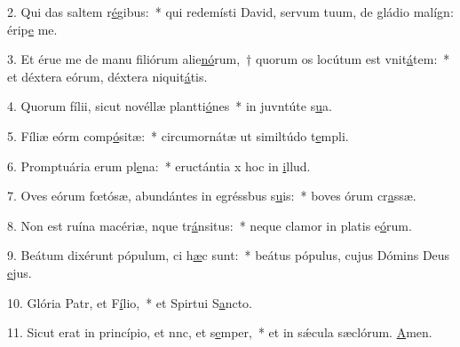 2. Qui das saltem r\uline{é}gibus:~* qui redemísti David, servum tuum, de gládio malígn: érip\uline{e} me.\par 
3. Et érue me de manu filiórum alie\uline{nó}rum,~† quorum os locútum est vnit\uline{á}tem:~* et déxtera eórum, déxtera niquit\uline{á}tis.\par 
4. Quorum fílii, sicut novéllæ plantti\uline{ó}nes~* in juvntúte s\uline{u}a.\par 
5. Fíliæ eórm comp\uline{ó}sitæ:~* circumornátæ ut similtúdo t\uline{e}mpli.\par 
6. Promptuária erum pl\uline{e}na:~* eructántia x hoc in \uline{i}llud.\par 
7. Oves eórum fœtósæ, abundántes in egréssbus s\uline{u}is:~* boves órum cr\uline{a}ssæ.\par 
8. Non est ruína macériæ, nque tr\uline{á}nsitus:~* neque clamor in platis e\uline{ó}rum.\par 
9. Beátum dixérunt pópulum, ci h\uline{æ}c sunt:~* beátus pópulus, cujus Dómins Deus \uline{e}jus.\par 
10. Glória Patr, et F\uline{í}lio,~* et Spirtui S\uline{a}ncto.\par 
11. Sicut erat in princípio, et nnc, et s\uline{e}mper,~* et in sǽcula sæclórum. \uline{A}men.\par 
